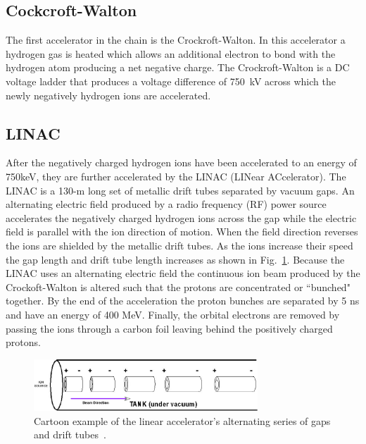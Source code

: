 \subsection{Cockcroft-Walton}
The first accelerator in the chain is the Crockroft-Walton. In this accelerator a hydrogen gas is heated which allows an additional electron to bond with the hydrogen atom producing a net negative charge. The Crockroft-Walton is a DC voltage ladder that produces a voltage difference of 750~kV across which the newly negatively hydrogen ions are accelerated.

\subsection{LINAC}
After the negatively charged hydrogen ions have been accelerated to an energy of 750keV, they are further accelerated by the LINAC (LINear ACcelerator). The LINAC is a 130-m long set of metallic drift tubes separated by vacuum gaps. An alternating electric field produced by a radio frequency (RF) power source accelerates the negatively charged hydrogen ions across the gap while the electric field is parallel with the ion direction of motion. When the field direction reverses the ions are shielded by the metallic drift tubes. As the ions increase their speed the gap length and drift tube length increases as shown in Fig.~\ref{LINAC}. Because the LINAC uses an alternating electric field the continuous ion beam produced by the Crockoft-Walton is altered such that the protons are concentrated or ``bunched" together. By the end of the acceleration the proton bunches are separated by 5 ns and have an energy of 400 MeV. Finally, the orbital electrons are removed by passing the ions through a carbon foil leaving behind the positively charged protons.

\begin{figure}[!h!tbp]
\begin{center}
\includegraphics[width=0.75\textwidth]{eps/Tevatron/LINAC.eps}
\end{center}
\vspace{-0.1in}
\caption{Cartoon example of the linear accelerator's alternating series of gaps and drift tubes~\cite{proton}.}
\label{LINAC}
\end{figure}

